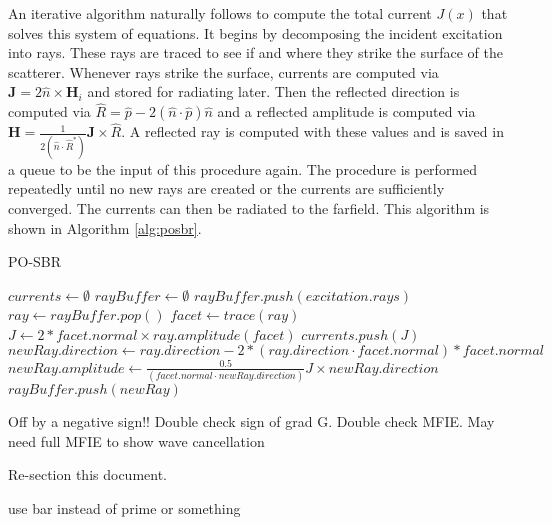 \documentclass{article}
\theoremstyle{plain}
\begin{document}
An iterative algorithm naturally follows to compute the total current $J(x)$ that solves this system of equations.
It begins by decomposing the incident excitation into rays.
These rays are traced to see if and where they strike the surface of the scatterer.
Whenever rays strike the surface, currents are computed via $\mathbf{J}=2\hat{n}\times \mathbf{H}_i$
and stored for radiating later.
Then the reflected direction is computed via $\hat{R} = \hat{p} - 2(\hat{n}\cdot\hat{p})\hat{n}$
and a reflected amplitude is computed via $\mathbf{H} = \frac{1}{2\left(\hat{n}\cdot\hat{R}^*\right)}\mathbf{J} \times \hat{R}$.
A reflected ray is computed with these values and is saved in a queue to be the input of this procedure again.
The procedure is performed repeatedly until no new rays are created or the currents are sufficiently converged.
The currents can then be radiated to the farfield. This algorithm is shown in Algorithm \ref{alg:posbr}.
\begin{algorithm}
\caption{PO-SBR}\label{alg:posbr}
\begin{algorithmic}[1]
\State $currents \gets \emptyset$
\State $rayBuffer \gets \emptyset$
\State $rayBuffer.push( excitation.rays )$
\State $ray \gets rayBuffer.pop()$
\State $facet \gets trace(ray)$
    \State $J \gets 2*facet.normal \times ray.amplitude(facet)$
    \State $currents.push(J)$
    \State $newRay.direction \gets ray.direction - 2*(ray.direction \cdot facet.normal)*facet.normal$
    \State $newRay.amplitude \gets \frac{0.5}{\left(facet.normal\cdot newRay.direction\right)} J \times newRay.direction$
    \State $rayBuffer.push( newRay )$
\EndIf
\EndWhile
\end{algorithmic}
\end{algorithm}


Off by a negative sign!!
Double check sign of grad G.
Double check MFIE.
May need full MFIE to show wave cancellation

Re-section this document.

use bar instead of prime or something
\end{document}
